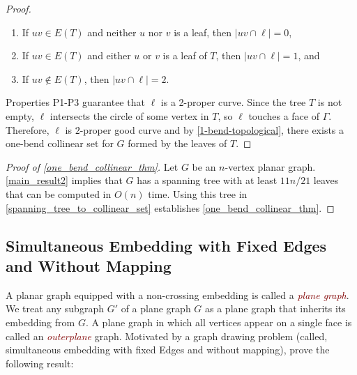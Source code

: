 \documentclass[11pt]{article}
\newcommand{\pat}[1]{\textcolor{red}{PM: #1}}
\newcommand{\defin}[1]{\emph{\textcolor{Maroon}{#1}}}
\theoremstyle{definition}
\newcommand{\vida}[1]{[{\color{pink}VD: #1}]}
\begin{document}
\begin{proof}
    \begin{enumerate}
        \item [(P1)] If $uv \in E(T)$ and neither $u$ nor $v$ is a leaf, then $|uv \cap \ell| = 0$,

        \item [(P2)] If $uv \in E(T)$ and either $u$ or $v$ is a leaf of $T$, then $|uv \cap \ell| = 1$, and

        \item [(P3)] If $uv \notin E(T)$, then $|uv \cap \ell| = 2$.
    \end{enumerate}

    Properties P1-P3 guarantee that $\ell$ is a 2-proper curve. Since the tree $T$ is not empty, $\ell$ intersects the circle of some vertex in $T$, so $\ell$ touches a face of $\Gamma$. Therefore, $\ell$ is $2$-proper good curve and by \cref{1-bend-topological}, there exists a one-bend collinear set for $G$ formed by the leaves of $T$.
\end{proof}

\begin{proof}[Proof of \cref{one_bend_collinear_thm}]
Let $G$ be an $n$-vertex planar graph. \cref{main_result2} implies that $G$ has a spanning tree with at least $11n/21$ leaves that can be computed in $O(n)$ time. Using this tree in \cref{spanning_tree_to_collinear_set} establishes \cref{one_bend_collinear_thm}.
\end{proof}



\subsection{Simultaneous Embedding with Fixed Edges and Without Mapping}



A planar graph equipped with a non-crossing embedding is called a \defin{plane graph}.  We treat any subgraph $G'$ of a plane graph $G$ as a plane graph that inherits its embedding from $G$. A plane graph in which all vertices appear on a single face is called an \defin{outerplane} graph.  Motivated by a graph drawing problem (called, simultaneous embedding with fixed Edges and without mapping), \citet{angelini.evans.ea:sefe} prove the following result:
\end{document}
